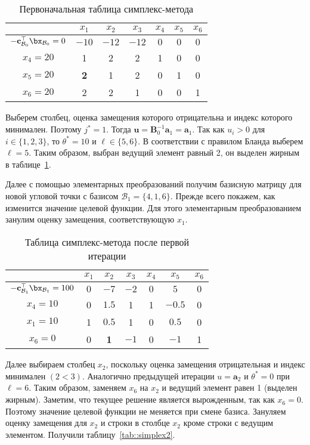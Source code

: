 \documentclass[12pt]{article}
\begin{document}
\begin{table}[!ht]
\centering
\caption{Первоначальная таблица симплекс-метода}
\begin{tabular}{|c|cccccc|}
\hline
& $x_1$ & $x_2$ & $x_3$ & $x_4$ & $x_5$ & $x_6$\\
\hline
$-\mathbf{c}_{\mathcal{B}_0}^{\top}\bx_{\mathcal{B}_0} = 0$ & $-10$ & $-12$ & $-12$ & $0$ & $0$ & $0$ \\
\hline
$x_4 = 20$ & 1 & 2 & 2 & 1 & 0 & 0 \\
$x_5 = 20$ & \textbf{2} & 1 & 2 & 0 & 1 & 0 \\
$x_6 = 20$ & 2 & 2 & 1 & 0 & 0 & 1 \\
\hline
\end{tabular}
\label{tab::simplex0}
\end{table}
Выберем столбец, оценка замещения которого отрицательна и индекс которого минимален.
Поэтому $j^* = 1$.
Тогда $\mathbf{u} = \mathbf{B}^{-1}_0\mathbf{a}_1 = \mathbf{a}_1.$
Так как $u_i > 0$ для $i \in \{1,2,3\}$, то $\theta^* = 10$ и $\ell \in \{5, 6\}$.
В соответствии с правилом Бланда выберем $\ell = 5$.
Таким образом, выбран ведущий элемент равный 2, он выделен жирным в таблице~\ref{tab::simplex0}.

Далее с помощью элементарных преобразований получим базисную матрицу для новой угловой точки с базисом $\mathcal{B}_1 = \{4, 1, 6\}$. 
Прежде всего покажем, как изменится значение целевой функции.
Для этого элементарным преобразованием занулим оценку замещения, соответствующую $x_1$.

\begin{table}[!ht]
\centering
\caption{Таблица симплекс-метода после первой итерации}
\begin{tabular}{|c|cccccc|}
\hline
& $x_1$ & $x_2$ & $x_3$ & $x_4$ & $x_5$ & $x_6$\\
\hline
$-\mathbf{c}_{\mathcal{B}_1}^{\top}\bx_{\mathcal{B}_1} = 100$ & $0$ & $-7$ & $-2$ & $0$ & $5$ & $0$ \\
\hline
$x_4 = 10$ & 0 & $1.5$ & 1 & 1 & $-0.5$ & 0 \\
$x_1 = 10$ & 1 & $0.5$ & 1 & 0 & $0.5$ & 0 \\
$x_6 = 0$ & 0 & \textbf{1} & $-1$ & 0 & $-1$ & 1 \\
\hline
\end{tabular}
\label{tab::simplex1}
\end{table}

Далее выбираем столбец $x_2$, поскольку оценка замещения отрицательная и индекс минимален $(2 < 3)$.
Аналогично предыдущей итерации $u = \mathbf{a}_2$ и $\theta^* = 0$ при $\ell = 6$. 
Таким образом, заменяем $x_6$ на $x_2$ и ведущий элемент равен 1 (выделен жирным). 
Заметим, что текущее решение является вырожденным, так как $x_6 = 0$. 
Поэтому значение целевой функции не меняется при смене базиса. 
Зануляем оценку замещения для $x_2$ и строки в столбце $x_2$ кроме строки с ведущим элементом. 
Получили таблицу~\ref{tab::simplex2}.
\end{document}
